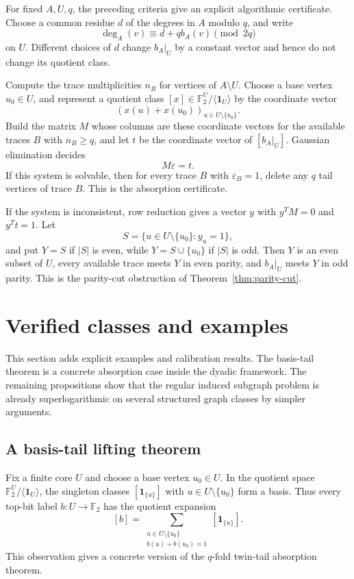 \documentclass[thmsec,dntnbr,nolinenbrs]{dmgt}
\numberwithin{equation}{section}
\newcommand{\F}{\mathbb{F}}
\newcommand{\one}{\mathbf{1}}
\begin{document}
For fixed \(A,U,q\), the preceding criteria give an explicit algorithmic certificate.  Choose a common residue \(d\) of the degrees in \(A\) modulo \(q\), and write
\[
        \deg_A(v)\equiv d+q b_A(v)\pmod {2q}
\]
on \(U\).  Different choices of \(d\) change \(b_A|_U\) by a constant vector and hence do not change its quotient class.

Compute the trace multiplicities \(n_B\) for vertices of \(A\setminus U\).  Choose a base vertex \(u_0\in U\), and represent a quotient class \([x]\in\F_2^U/\langle\one_U\rangle\) by the coordinate vector
\[
        (x(u)+x(u_0))_{u\in U\setminus\{u_0\}}.
\]
Build the matrix \(M\) whose columns are these coordinate vectors for the available traces \(B\) with \(n_B\ge q\), and let \(t\) be the coordinate vector of \([b_A|_U]\).  Gaussian elimination decides
\[
        M\varepsilon=t.
\]
If this system is solvable, then for every trace \(B\) with \(\varepsilon_B=1\), delete any \(q\) tail vertices of trace \(B\).  This is the absorption certificate.

If the system is inconsistent, row reduction gives a vector \(y\) with \(y^TM=0\) and \(y^Tt=1\).  Let
\[
        S=\{u\in U\setminus\{u_0\}:y_u=1\},
\]
and put \(Y=S\) if \(|S|\) is even, while \(Y=S\cup\{u_0\}\) if \(|S|\) is odd.  Then \(Y\) is an even subset of \(U\), every available trace meets \(Y\) in even parity, and \(b_A|_U\) meets \(Y\) in odd parity.  This is the parity-cut obstruction of Theorem~\ref{thm:parity-cut}.

\section{Verified classes and examples}

This section adds explicit examples and calibration results.  The basis-tail theorem is a concrete absorption case inside the dyadic framework.  The remaining propositions show that the regular induced subgraph problem is already superlogarithmic on several structured graph classes by simpler arguments.

\subsection{A basis-tail lifting theorem}

Fix a finite core \(U\) and choose a base vertex \(u_0\in U\).  In the quotient space \(\F_2^U/\langle \one_U\rangle\), the singleton classes \([\one_{\{u\}}]\) with \(u\in U\setminus\{u_0\}\) form a basis.  Thus every top-bit label \(b:U\to\F_2\) has the quotient expansion
\[
        [b]=\sum_{\substack{u\in U\setminus\{u_0\}\\ b(u)+b(u_0)=1}}[\one_{\{u\}}].
\]
This observation gives a concrete version of the \(q\)-fold twin-tail absorption theorem.
\end{document}

